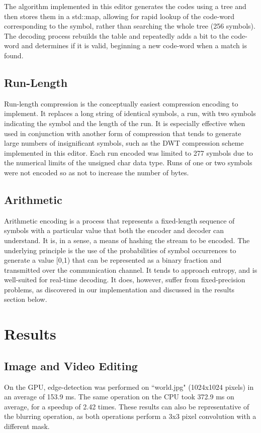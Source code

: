 \documentclass[10pt,twocolumn,twoside]{IEEEtran}
\begin{document}
The algorithm implemented in this editor generates the codes using a tree and then stores them in a std::map, 
allowing for rapid lookup of the code-word corresponding to the symbol, rather than searching the whole tree 
(256 symbols). The decoding process rebuilds the table and repeatedly adds a bit to the code-word and 
determines if it is valid, beginning a new code-word when a match is found. 

\subsection{Run-Length}
Run-length compression is the conceptually easiest compression encoding to implement. It replaces a long 
string of identical symbols, a run, with two symbols indicating the symbol and the length of the run. It is 
especially effective when used in conjunction with another form of compression that tends to generate large 
numbers of insignificant symbols, such as the DWT compression scheme implemented in this editor. Each run 
encoded was limited to 277 symbols due to the numerical limits of the unsigned char data type. Runs of one or 
two symbols were not encoded so as not to increase the number of bytes.

\subsection{Arithmetic}
Arithmetic encoding is a process that represents a fixed-length sequence of symbols with a particular value 
that both the encoder and decoder can understand. It is, in a sense, a means of hashing the stream to be 
encoded. The underlying principle is the use of the probabilities of symbol occurrences to generate a value 
[0,1) that can be represented as a binary fraction and transmitted over the communication channel. It tends to 
approach entropy, and is well-suited for real-time decoding. It does, however, suffer from fixed-precision 
problems, as discovered in our implementation and discussed in the results section below.

\section{Results}

\subsection{Image and Video Editing}
On the GPU, edge-detection was performed on ``world.jpg" (1024x1024 pixels) in an average of 153.9 ms. The 
same operation on the CPU took 372.9 ms on average, for a speedup of 2.42 times. These results can also be 
representative of the blurring operation, as both operations perform a 3x3 pixel convolution with a different 
mask.
\end{document}
